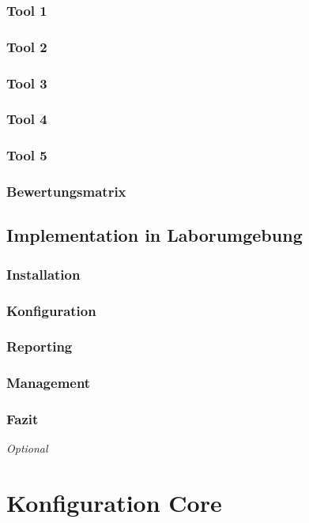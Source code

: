 \documentclass[11pt,a4paper,parskip=half]{scrartcl}
\begin{document}
\subsubsection{Tool 1}
\subsubsection{Tool 2}
\subsubsection{Tool 3}
\subsubsection{Tool 4}
\subsubsection{Tool 5}
\subsubsection{Bewertungsmatrix}
\subsection{Implementation in Laborumgebung}
\subsubsection{Installation}
\subsubsection{Konfiguration}
\subsubsection{Reporting}
\subsubsection{Management}
\subsubsection{Fazit}
\textit{Optional}

\newpage
\appendix
{}
{}
\section{Konfiguration Core}

\newpage
\end{document}
